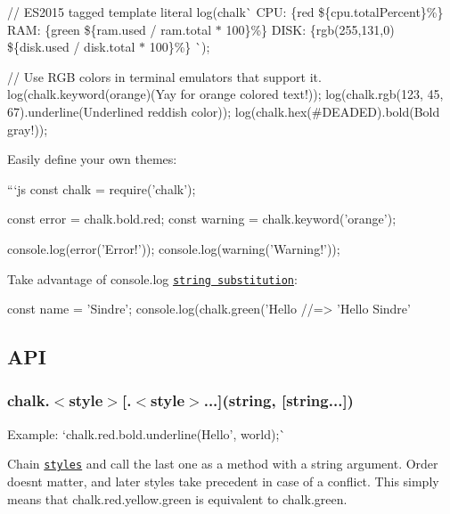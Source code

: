 // E\+S2015 tagged template literal log(chalk\`{} C\+PU\+: \{red \$\{cpu.\+total\+Percent\}\%\} R\+AM\+: \{green \$\{ram.\+used / ram.\+total $\ast$ 100\}\%\} D\+I\+SK\+: \{rgb(255,131,0) \$\{disk.\+used / disk.\+total $\ast$ 100\}\%\} \`{});

// Use R\+GB colors in terminal emulators that support it. log(chalk.\+keyword(\textquotesingle{}orange\textquotesingle{})(\textquotesingle{}Yay for orange colored text!\textquotesingle{})); log(chalk.\+rgb(123, 45, 67).underline(\textquotesingle{}Underlined reddish color\textquotesingle{})); log(chalk.\+hex(\textquotesingle{}\#\+D\+E\+A\+D\+ED\textquotesingle{}).bold(\textquotesingle{}Bold gray!\textquotesingle{})); 
\begin{DoxyCode}
Easily define your own themes:

```js
const chalk = require('chalk');

const error = chalk.bold.red;
const warning = chalk.keyword('orange');

console.log(error('Error!'));
console.log(warning('Warning!'));
\end{DoxyCode}


Take advantage of console.\+log \href{https://nodejs.org/docs/latest/api/console.html#console_console_log_data_args}{\tt string substitution}\+:


\begin{DoxyCode}
const name = 'Sindre';
console.log(chalk.green('Hello %
//=> 'Hello Sindre'
\end{DoxyCode}


\subsection*{A\+PI}

\subsubsection*{chalk.{\ttfamily $<$style$>$\mbox{[}.$<$style$>$...\mbox{]}(string, \mbox{[}string...\mbox{]})}}

Example\+: `chalk.\+red.\+bold.\+underline(\textquotesingle{}Hello', \textquotesingle{}world\textquotesingle{});\`{}

Chain \href{#styles}{\tt styles} and call the last one as a method with a string argument. Order doesn\textquotesingle{}t matter, and later styles take precedent in case of a conflict. This simply means that {\ttfamily chalk.\+red.\+yellow.\+green} is equivalent to {\ttfamily chalk.\+green}.

